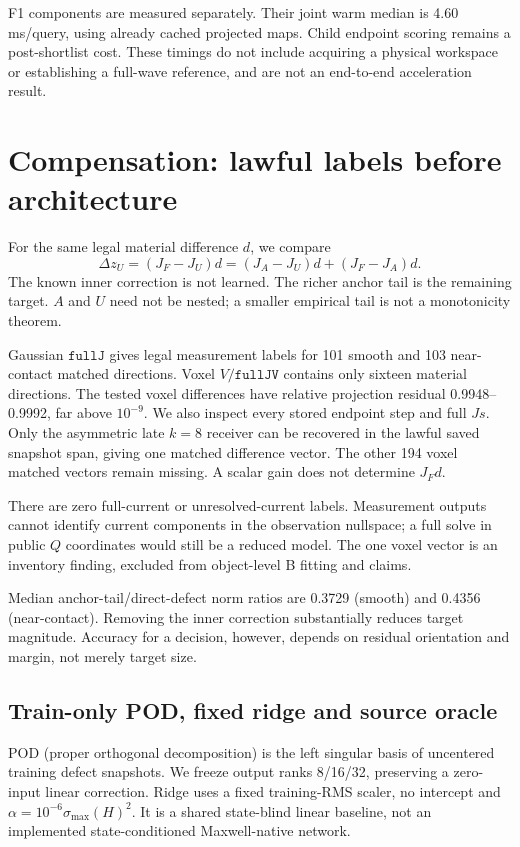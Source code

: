 \documentclass[11pt,a4paper]{article}
\newcommand{\code}[1]{\texttt{#1}}
\begin{document}
F1 components are measured separately. Their joint warm median is 4.60 ms/query, using already cached projected maps. Child endpoint scoring remains a post-shortlist cost. These timings do not include acquiring a physical workspace or establishing a full-wave reference, and are not an end-to-end acceleration result.

\section{Compensation: lawful labels before architecture}
For the same legal material difference $d$, we compare
\begin{equation}
 \Delta z_U=(J_F-J_U)d=(J_A-J_U)d+(J_F-J_A)d.
\end{equation}
The known inner correction is not learned. The richer anchor tail is the remaining target. $A$ and $U$ need not be nested; a smaller empirical tail is not a monotonicity theorem.

Gaussian $\code{fullJ}$ gives legal measurement labels for 101 smooth and 103 near-contact matched directions. Voxel $V/\code{fullJV}$ contains only sixteen material directions. The tested voxel differences have relative projection residual 0.9948--0.9992, far above $10^{-9}$. We also inspect every stored endpoint step and full $Js$. Only the asymmetric late $k=8$ receiver can be recovered in the lawful saved snapshot span, giving one matched difference vector. The other 194 voxel matched vectors remain missing. A scalar gain does not determine $J_Fd$.

There are zero full-current or unresolved-current labels. Measurement outputs cannot identify current components in the observation nullspace; a full solve in public $Q$ coordinates would still be a reduced model. The one voxel vector is an inventory finding, excluded from object-level B fitting and claims.

Median anchor-tail/direct-defect norm ratios are 0.3729 (smooth) and 0.4356 (near-contact). Removing the inner correction substantially reduces target magnitude. Accuracy for a decision, however, depends on residual orientation and margin, not merely target size.

\subsection{Train-only POD, fixed ridge and source oracle}
POD (proper orthogonal decomposition) is the left singular basis of uncentered training defect snapshots. We freeze output ranks 8/16/32, preserving a zero-input linear correction. Ridge uses a fixed training-RMS scaler, no intercept and $\alpha=10^{-6}\sigma_{\max}(H)^2$. It is a shared state-blind linear baseline, not an implemented state-conditioned Maxwell-native network.
\end{document}
